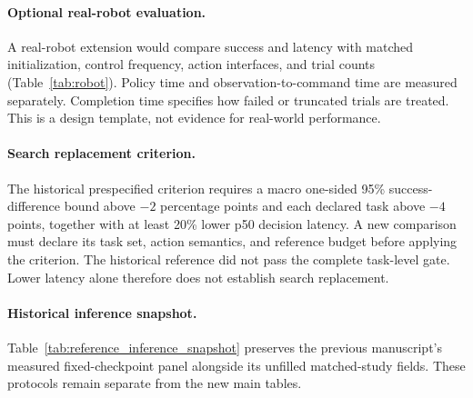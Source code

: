 \paragraph{Optional real-robot evaluation.}
A real-robot extension would compare success and latency with matched initialization, control frequency, action interfaces, and trial counts (Table~\ref{tab:robot}). Policy time and observation-to-command time are measured separately. Completion time specifies how failed or truncated trials are treated. This is a design template, not evidence for real-world performance.
\begin{table}[t]
\centering\scriptsize
\resizebox{\textwidth}{!}{}
\caption{Optional real-robot template; no trials are asserted. SR/CI denotes success rate and its uncertainty.}
\label{tab:robot}
\end{table}

\paragraph{Search replacement criterion.}
The historical prespecified criterion requires a macro one-sided 95\% success-difference bound above $-2$ percentage points and each declared task above $-4$ points, together with at least 20\% lower p50 decision latency. A new comparison must declare its task set, action semantics, and reference budget before applying the criterion. The historical reference did not pass the complete task-level gate. Lower latency alone therefore does not establish search replacement.

\paragraph{Historical inference snapshot.}
Table~\ref{tab:reference_inference_snapshot} preserves the previous manuscript's measured fixed-checkpoint panel alongside its unfilled matched-study fields. These protocols remain separate from the new main tables.
\begin{table}[t]
\centering\small

\caption{Preserved historical inference snapshot. The measured panel uses one training seed and its original evaluation cohort; pending rows retain their original result slots.}
\label{tab:reference_inference_snapshot}
\end{table}
